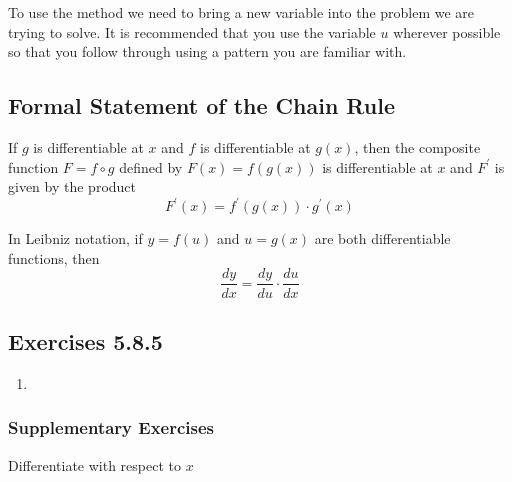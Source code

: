 To use the method we need to bring a new variable into the problem we are trying to solve. It
is recommended that you use the variable $u$ wherever possible so that you follow through using a pattern you are familiar with. 

\subsection{Formal Statement of the Chain Rule}
If $g$ is differentiable at $x$ and $f$ is differentiable at $g (x)$, then the composite function $F =f \circ g$ defined by $F (x) =f (g (x))$ is differentiable at $x$ and $F^{ \prime }$ is given by the product
\begin{equation*}F^{ \prime } (x) =f^{ \prime } (g (x)) \cdot g^{ \prime } (x)
\end{equation*}

In Leibniz notation, if $y =f (u)$ and $u =g (x)$ are both differentiable functions, then
\begin{equation*}\frac{d y}{d x} =\frac{d y}{d u} \cdot \frac{d u}{d x}
\end{equation*}

\subsection{Exercises 5.8.5}
\begin{enumerate}
\item   
\columnsep =30pt
 \end{enumerate}


\subsubsection{Supplementary Exercises}
Differentiate with respect to $x$ 


